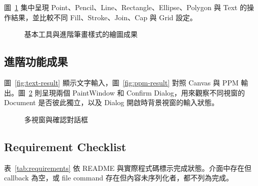 圖~\ref{fig:drawing-result} 集中呈現 Point、Pencil、Line、Rectangle、Ellipse、Polygon 與 Text 的操作結果，並比較不同 Fill、Stroke、Join、Cap 與 Grid 設定。

\begin{figure}[H]
    \centering
    \caption{基本工具與進階筆畫樣式的繪圖成果}
    \label{fig:drawing-result}
\end{figure}

\subsection{進階功能成果}

圖~\ref{fig:text-result} 顯示文字輸入，圖~\ref{fig:ppm-result} 對照 Canvas 與 PPM 輸出。圖~\ref{fig:multiwindow-result} 則呈現兩個 PaintWindow 和 Confirm Dialog，用來觀察不同視窗的 Document 是否彼此獨立，以及 Dialog 開啟時背景視窗的輸入狀態。

\begin{figure}[H]
    \centering
    \caption{多視窗與確認對話框}
    \label{fig:multiwindow-result}
\end{figure}

\subsection{Requirement Checklist}

表~\ref{tab:requirements} 依 README 與實際程式碼標示完成狀態。介面中存在但 callback 為空，或 file command 存在但內容未序列化者，都不列為完成。

